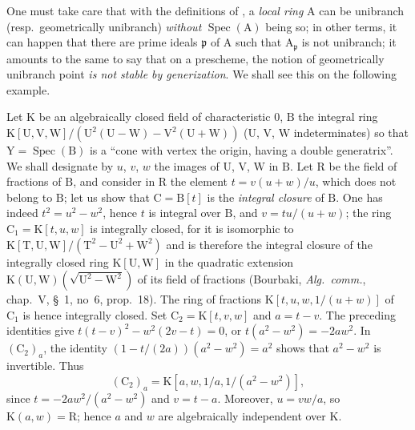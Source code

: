 \begin{env}[6.15.2]
\label{IV.6.15.2}
One must take care that with the definitions of , a \emph{local
ring} $\mathrm{A}$ can be unibranch (resp.\ geometrically unibranch) \emph{without} $\operatorname{Spec}(\mathrm{A})$
being so; in other terms, it can happen that there are prime ideals $\mathfrak{p}$ of $\mathrm{A}$ such
that $\mathrm{A}_\mathfrak{p}$ is not unibranch; it amounts to the same to say that on a prescheme,
the notion of geometrically unibranch point \emph{is not stable by generization}. We
shall see this on the following example.
\end{env}


Let $\mathrm{K}$ be an algebraically closed field of characteristic $0$, $\mathrm{B}$ the integral ring
$\mathrm{K}[\mathrm{U},\mathrm{V},\mathrm{W}]/(\mathrm{U}^2(\mathrm{U}-\mathrm{W})-\mathrm{V}^2(\mathrm{U}+\mathrm{W}))$ ($\mathrm{U}$, $\mathrm{V}$, $\mathrm{W}$ indeterminates) so that
$\mathrm{Y}=\operatorname{Spec}(\mathrm{B})$ is a ``cone with vertex the origin, having a double generatrix''.
We shall designate by $u$, $v$, $w$ the images of $\mathrm{U}$, $\mathrm{V}$, $\mathrm{W}$ in $\mathrm{B}$. Let $\mathrm{R}$ be the field of
fractions of $\mathrm{B}$, and consider in $\mathrm{R}$ the element $t=v(u+w)/u$, which does not belong
to $\mathrm{B}$; let us show that $\mathrm{C}=\mathrm{B}[t]$ is the \emph{integral closure} of $\mathrm{B}$. One has indeed $t^2=u^2-w^2$,
hence $t$ is integral over $\mathrm{B}$, and $v=tu/(u+w)$; the ring $\mathrm{C}_1=\mathrm{K}[t,u,w]$ is integrally
closed, for it is isomorphic to $\mathrm{K}[\mathrm{T},\mathrm{U},\mathrm{W}]/(\mathrm{T}^2-\mathrm{U}^2+\mathrm{W}^2)$ and is therefore the integral
closure of the integrally closed ring $\mathrm{K}[\mathrm{U},\mathrm{W}]$ in the quadratic extension
$\mathrm{K}(\mathrm{U},\mathrm{W})(\sqrt{\mathrm{U}^2-\mathrm{W}^2})$ of its field of fractions (Bourbaki, \emph{Alg.~comm.}, chap.~V, \S~1,
no~6, prop.~18). The ring of fractions $\mathrm{K}[t,u,w,1/(u+w)]$ of $\mathrm{C}_1$ is hence
integrally closed. Set $\mathrm{C}_2=\mathrm{K}[t,v,w]$ and $a=t-v$. The preceding identities give
$t(t-v)^2-w^2(2v-t)=0$, or $t(a^2-w^2)=-2aw^2$.
In $(\mathrm{C}_2)_a$, the identity $(1-t/(2a))(a^2-w^2)=a^2$ shows that
$a^2-w^2$ is invertible. Thus
\[
(\mathrm{C}_2)_a=\mathrm{K}[a,w,1/a,1/(a^2-w^2)],
\]
since $t=-2aw^2/(a^2-w^2)$ and $v=t-a$. Moreover, $u=vw/a$, so
$\mathrm{K}(a,w)=\mathrm{R}$; hence $a$ and $w$ are algebraically independent over $\mathrm{K}$.
